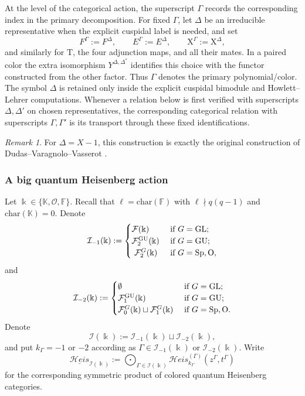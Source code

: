 \documentclass[12pt]{amsart}
\numberwithin{itemcounter}{subsection}
\theoremstyle{plain}
\theoremstyle{definition}
\theoremstyle{remark}
\newtheorem{remark}[theorem]{Remark}
\numberwithin{equation}{section}
\def\bbF{\mathbb{F}}
\def\bbK{\mathbb{K}}
\def\k{\Bbbk}
\def\calF{\mathcal{F}}
\def\calI{\mathcal{I}}
\def\calO{\mathcal{O}}
\def\Sp{\mathrm{Sp}}
\def\GL{\mathrm{GL}}
\def\GU{\mathrm{GU}}
\def\Heis{\mathcal{H}eis}
\def\Heis{\mathcal{H}eis}
\def\symHeis{\underline{\mathcal{H}eis}}
\begin{document}
At the level of the categorical action, the superscript $\Gamma$ records the corresponding index in the primary decomposition.  For fixed $\Gamma$, let $\Delta$ be an irreducible representative when the explicit cuspidal label is needed, and set
\[
F^\Gamma:=F^\Delta,\qquad
E^\Gamma:=E^\Delta,\qquad
\mathrm{X}^\Gamma:=\mathrm{X}^\Delta,
\]
and similarly for $\mathrm{T}$, the four adjunction maps, and all their mates.  In a
paired color the extra isomorphism
$Y^{\Delta,\Delta^*}$ identifies this choice with the functor constructed from the other factor.
Thus $\Gamma$ denotes the primary polynomial/color.  The symbol
$\Delta$ is retained only inside the explicit cuspidal bimodule and Howlett--Lehrer
computations.  Whenever a relation below is first verified with superscripts
$\Delta,\Delta'$ on chosen representatives, the corresponding categorical relation
with superscripts $\Gamma,\Gamma'$ is its transport through these fixed identifications.

\begin{remark}
For $\Delta=X-1$, this construction is exactly the original construction of
Dudas--Varagnolo--Vasserot \cite{DVV17,DVV19}.
\end{remark}

\subsubsection{A big quantum Heisenberg action}
Let $\k \in \{\bbK,\calO,\bbF\}.$
Recall that $\ell=\mathrm{char}(\bbF)$ with $\ell\nmid q(q-1)$ and  $\mathrm{char}(\bbK)=0.$
Denote \begin{align*}
   \calI_{-1}(\k):=\begin{cases}
 \calF(\k) \,\,&\text{if}\,\,G=\GL;\\ \calF^{\GU}_2(\k) \,\,&\text{if}\,\,G=\GU;\\\
 \calF^{G}_2(\k)\,\,&\text{if} \,\,G=\Sp, {\rm O},
\end{cases}\end{align*}
and
 \begin{align*}
   \calI_{-2}(\k):=\begin{cases}
 \emptyset \,\,&\text{if}\,\,G=\GL;\\ \calF^{\GU}_1(\k) \,\,&\text{if}\,\,G=\GU;\\
 \calF^{G}_0(\k)\sqcup \calF^{G}_1(\k)\,\,&\text{if} \,\,G=\Sp, {\rm O}.
\end{cases}\end{align*}
Denote  $$\calI(\k):= \calI_{-1}(\k)\sqcup \calI_{-2}(\k),$$
and put $k_\Gamma=-1$ or $-2$ according as
$\Gamma\in\calI_{-1}(\k)$ or $\calI_{-2}(\k)$.  Write
\[
 \symHeis_{\calI(\k)}:=
 \bigodot_{\Gamma\in\calI(\k)}
 \Heis^{(\Gamma)}_{k_\Gamma}(z^\Gamma,t^\Gamma)
\]
for the corresponding symmetric product of colored quantum Heisenberg
categories.
\end{document}
